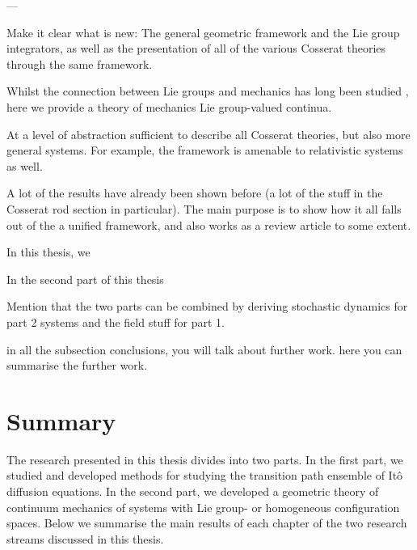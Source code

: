 \documentclass[]{cam-thesis}
\begin{document}
---

Make it clear what is new: The general geometric framework and the Lie group integrators, as well as the presentation of all of the various Cosserat theories through the same framework.

Whilst the connection between Lie groups and mechanics has long been studied \citep{marsdenIntroductionMechanicsSymmetry2013}, here we provide a theory of mechanics Lie group-valued continua.

At a level of abstraction sufficient to describe all Cosserat theories, but also more general systems. For example, the framework is amenable to relativistic systems as well.

A lot of the results have already been shown before (a lot of the stuff in the Cosserat rod section in particular). The main purpose is to show how it all falls out of the a unified framework, and also works as a review article to some extent.


 In this thesis, we 
 
 In the second part of this thesis
 
 Mention that the two parts can be combined by deriving stochastic dynamics for part 2 systems and the field stuff for part 1.

in all the subsection conclusions, you will talk about further work. here you can summarise the further work.






















\chapter*{Summary}
 
The research presented in this thesis divides into two parts. In the first part, we studied and developed methods for studying the transition path ensemble of It\^{o} diffusion equations. In the second part, we developed a geometric theory of continuum mechanics of systems with Lie group- or homogeneous configuration spaces. Below we summarise the main results of each chapter of the two research streams discussed in this thesis.
\end{document}
